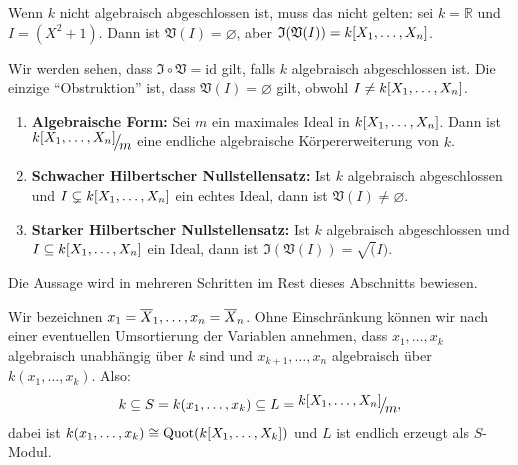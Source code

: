 \documentclass[a4paper,12pt]{scrbook}
\theoremstyle{blah}
\theoremstyle{stz}
\def\V{\mathfrak{V}}
\def\I{\mathfrak{I}}
\newcommand{\id}{\mathrm{id}}
\newcommand{\leer}{\ensuremath{\varnothing}}
\newcommand{\Quot}{\mathrm{Quot}}
\newcommand{\set}[1]{\ensuremath{\mathbb{#1}}}
\newcommand{\R}{\set{R}}
\def\Bar#1{\ensuremath\overline{#1}}
\newcommand{\Quotient}[2]{
  \raisebox{0.7ex}{\ensuremath{#1}}
  \ensuremath{\mkern-3mu}\big/\ensuremath{\mkern-3mu}
  \raisebox{-0.6ex}{\ensuremath{#2}}}
\newcommand{\polyx}[1][n]{\ensuremath%
  [X_{1},\dotsc,X_{#1}]}
\begin{document}
\begin{bsp*}
  Wenn $k$ nicht algebraisch abgeschlossen ist, muss das nicht gelten: sei $k=\R$ und $I=(X^2+1)$. Dann ist $\V(I)=\leer$, aber
  $\I(\V(I)) = k\polyx$.
\end{bsp*}

Wir werden sehen, dass $\I\circ\V=\id$ gilt, falls $k$ algebraisch abgeschlossen ist. Die einzige \enquote{Obstruktion} ist,
dass $\V(I)=\leer$ gilt, obwohl $I\neq k\polyx$.

\begin{satz}\label{satz2}\label{HNS}
  \begin{enumerate}
  \item {\bf Algebraische Form:}\label{satz2a} Sei $m$ ein maximales Ideal in $k\polyx$. Dann ist $\Quotient{k\polyx}{m}$ eine
    endliche algebraische Körpererweiterung von $k$.
  \item {\bf Schwacher Hilbertscher Nullstellensatz:}\label{satz2b} Ist $k$ algebraisch abgeschlossen und $I\subsetneq k\polyx$
    ein echtes Ideal, dann ist $\V(I)\neq\leer$.
  \item {\bf Starker Hilbertscher Nullstellensatz:}\label{satz2c} Ist $k$ algebraisch abgeschlossen und $I\subseteq k\polyx$ ein
    Ideal, dann ist $\I(\V(I))=\sqrt(I)$.
  \end{enumerate}
\end{satz}

Die Aussage wird in mehreren Schritten im Rest dieses Abschnitts bewiesen.

Wir bezeichnen $x_1=\Bar{X}_1,\dotsc,x_n=\Bar{X}_n$. Ohne Einschränkung können wir nach einer eventuellen Umsortierung
der Variablen annehmen, dass $x_1,\dotsc,x_k$ algebraisch unabhängig über $k$ sind und $x_{k+1},\dotsc,x_n$ algebraisch über
$k(x_1,\dotsc,x_k)$. Also:
\[ k \subseteq S = k(x_1,\dotsc,x_k) \subseteq L=\Quotient{k\polyx}{m}, \]
dabei ist $k(x_1,\dotsc,x_k)\cong\Quot(k\polyx[k])$ und $L$ ist endlich erzeugt als $S$-Modul.
\end{document}
